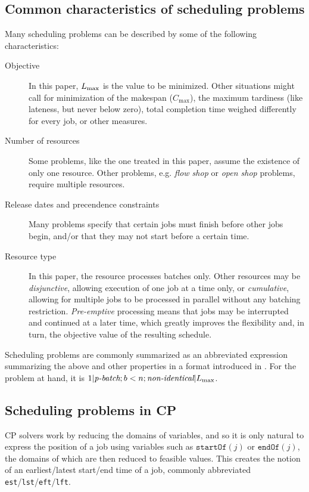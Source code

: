 \documentclass[13pt, letterpaper, oneside]{book}
\begin{document}
\subsection{Common characteristics of scheduling problems}
Many scheduling problems can be described by some of the following
characteristics:
\begin{description}
\item[Objective]{In this paper, $L_{\text{max}}$ is the value to be minimized. Other
situations might call for minimization of the makespan ($C_\text{max}$), the
maximum tardiness (like lateness, but never below zero), total completion time
weighed differently for every job, or other measures.}
\item[Number of resources]{Some problems, like the one treated in this paper,
assume the existence of only one resource. Other problems, e.g. \textit{flow
shop} or \textit{open shop} problems, require multiple resources.}
\item[Release dates and precendence constraints]{Many problems specify that
certain jobs must finish before other jobs begin, and/or that they may not start
before a certain time.}
\item[Resource type]{In this paper, the resource processes batches only. Other
resources may be \textit{disjunctive}, allowing execution of one job at a time
only, or \textit{cumulative}, allowing for multiple jobs to be processed in
parallel without any batching restriction. \textit{Pre-emptive} processing means
that jobs may be interrupted and continued at a later time, which greatly
improves the flexibility and, in turn, the objective value of the resulting
schedule.}
\end{description}

Scheduling problems are commonly summarized as an abbreviated expression
summarizing the above and other properties in a format introduced in
\citet{graham}. For the problem at hand, it is $1|\textit{p-batch}; b < n;
\textit{non-identical}|L_{\text{max}}$.

\subsection{Scheduling problems in CP}
CP solvers work by reducing the domains of variables, and so it is only natural
to express the position of a job using variables such as $\mathtt{startOf}(j)$
or $\mathtt{endOf}(j)$, the domains of which are then reduced to feasible
values. This creates the notion of an earliest/latest start/end time of a job,
commonly abbreviated \texttt{est}/\texttt{lst}/\texttt{eft}/\texttt{lft}.
\end{document}
